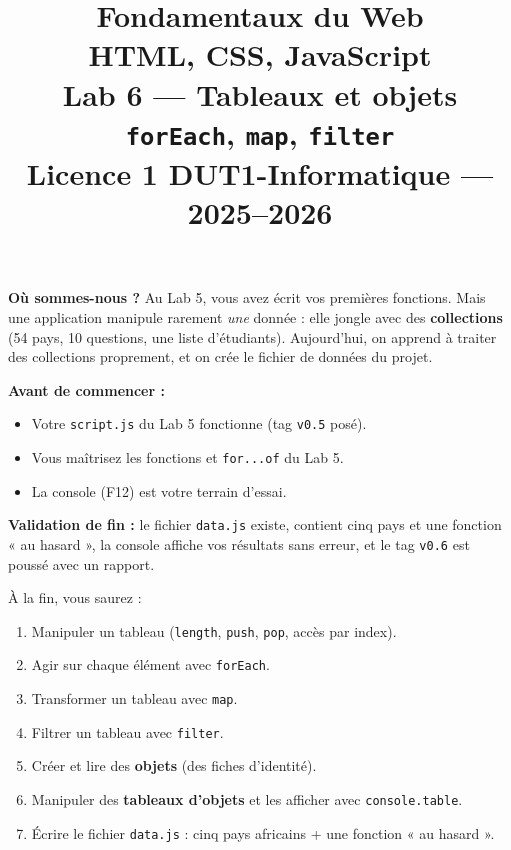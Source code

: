 \documentclass[11pt,a4paper]{article}
\title{%
\vspace{-1cm}
\textbf{\LARGE Fondamentaux du Web}\\
\textbf{\LARGE HTML, CSS, JavaScript}\\[0.8cm]
\textbf{\huge Lab 6 --- Tableaux et objets}\\[0.3cm]
\textbf{\Large \texttt{forEach}, \texttt{map}, \texttt{filter}}\\[0.5cm]
\large Licence 1 DUT1-Informatique --- 2025--2026}
\date{}
\author{}
\newcommand{\code}[1]{\texttt{#1}}
\begin{document}
\maketitle
\thispagestyle{empty}

\begin{prereqbox}
\textbf{Où sommes-nous ?} Au Lab 5, vous avez écrit vos premières fonctions. Mais une application manipule rarement \emph{une} donnée : elle jongle avec des \textbf{collections} (54 pays, 10 questions, une liste d'étudiants). Aujourd'hui, on apprend à traiter des collections proprement, et on crée le fichier de données du projet.

\smallskip
\textbf{Avant de commencer :}
\begin{itemize}[leftmargin=*,noitemsep]
  \item Votre \code{script.js} du Lab 5 fonctionne (tag \code{v0.5} posé).
  \item Vous maîtrisez les fonctions et \code{for...of} du Lab 5.
  \item La console (F12) est votre terrain d'essai.
\end{itemize}

\smallskip
\textbf{Validation de fin :} le fichier \code{data.js} existe, contient cinq pays et une fonction « au hasard », la console affiche vos résultats sans erreur, et le tag \code{v0.6} est poussé avec un rapport.
\end{prereqbox}

\begin{objectifbox}
À la fin, vous saurez :
\begin{enumerate}[leftmargin=*,noitemsep]
  \item Manipuler un tableau (\code{length}, \code{push}, \code{pop}, accès par index).
  \item Agir sur chaque élément avec \code{forEach}.
  \item Transformer un tableau avec \code{map}.
  \item Filtrer un tableau avec \code{filter}.
  \item Créer et lire des \textbf{objets} (des fiches d'identité).
  \item Manipuler des \textbf{tableaux d'objets} et les afficher avec \code{console.table}.
  \item Écrire le fichier \code{data.js} : cinq pays africains + une fonction « au hasard ».
\end{enumerate}
\end{objectifbox}
\end{document}
